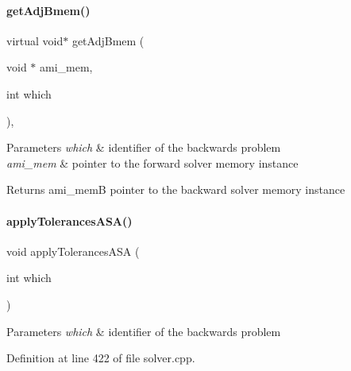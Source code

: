 \paragraph{\texorpdfstring{getAdjBmem()}{getAdjBmem()}}
{\footnotesize\ttfamily virtual void$\ast$ get\+Adj\+Bmem (\begin{DoxyParamCaption}\item[{void $\ast$}]{ami\+\_\+mem,  }\item[{int}]{which }\end{DoxyParamCaption})\hspace{0.3cm}{\ttfamily [protected]}, {}}


\begin{DoxyParams}{Parameters}
{\em which} & identifier of the backwards problem \\
\hline
{\em ami\+\_\+mem} & pointer to the forward solver memory instance \\
\hline
\end{DoxyParams}
\begin{DoxyReturn}{Returns}
ami\+\_\+memB pointer to the backward solver memory instance 
\end{DoxyReturn}
\mbox{\label{classamici_1_1_solver_abdf8989d57153fde8988e73a98979297}} 
\paragraph{\texorpdfstring{applyTolerancesASA()}{applyTolerancesASA()}}
{\footnotesize\ttfamily void apply\+Tolerances\+A\+SA (\begin{DoxyParamCaption}\item[{int}]{which }\end{DoxyParamCaption})\hspace{0.3cm}{\ttfamily [protected]}}


\begin{DoxyParams}{Parameters}
{\em which} & identifier of the backwards problem \\
\hline
\end{DoxyParams}


Definition at line 422 of file solver.\+cpp.

